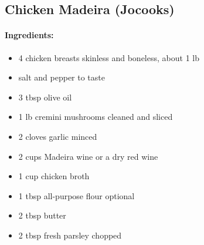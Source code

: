 \documentclass{article}
\begin{document}
\subsection{Chicken Madeira (Jocooks)}

\paragraph{Ingredients:}
\begin{itemize}
    \item 4 chicken breasts skinless and boneless, about 1 lb
    \item salt and pepper to taste
    \item 3 tbsp olive oil
    \item 1 lb cremini mushrooms cleaned and sliced
    \item 2 cloves garlic minced
    \item 2 cups Madeira wine or a dry red wine
    \item 1 cup chicken broth
    \item 1 tbsp all-purpose flour optional
    \item 2 tbsp butter
    \item 2 tbsp fresh parsley chopped
\end{itemize}
\end{document}
